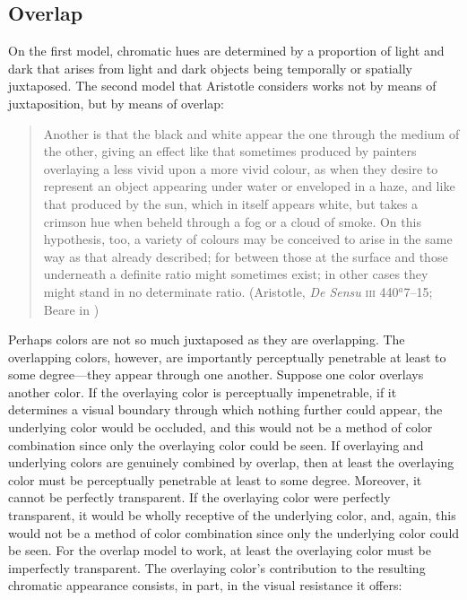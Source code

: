 \subsection{Overlap} %
\label{sub:overlap}
On the first model, chromatic hues are determined by a proportion of light and dark that arises from light and dark objects being temporally or spatially juxtaposed. The second model that Aristotle considers works not by means of juxtaposition, but by means of overlap:
\begin{quote}
	Another is that the black and white appear the one through the medium of the other, giving an effect like that sometimes produced by painters overlaying a less vivid upon a more vivid colour, as when they desire to represent an object appearing under water or enveloped in a haze, and like that produced by the sun, which in itself appears white, but takes a crimson hue when beheld through a fog or a cloud of smoke. On this hypothesis, too, a variety of colours may be conceived to arise in the same way as that already described; for between those at the surface and those underneath a definite ratio might sometimes exist; in other cases they might stand in no determinate ratio. (Aristotle, \emph{De Sensu} \textsc{iii} 440\( ^{a} \)7--15; Beare in \citealt[8--9]{Barnes:1984uq})
\end{quote}
Perhaps colors are not so much juxtaposed as they are overlapping. The overlapping colors, however, are importantly perceptually penetrable at least to some degree---they appear through one another. Suppose one color overlays another color. If the overlaying color is perceptually impenetrable, if it determines a visual boundary through which nothing further could appear, the underlying color would be occluded, and this would not be a method of color combination since only the overlaying color could be seen. If overlaying and underlying colors are genuinely combined by overlap, then at least the overlaying color must be perceptually penetrable at least to some degree. Moreover, it cannot be perfectly transparent. If the overlaying color were perfectly transparent, it would be wholly receptive of the underlying color, and, again, this would not be a method of color combination since only the underlying color could be seen. For the overlap model to work, at least the overlaying color must be imperfectly transparent. The overlaying color's contribution to the resulting chromatic appearance consists, in part, in the visual resistance it offers:
